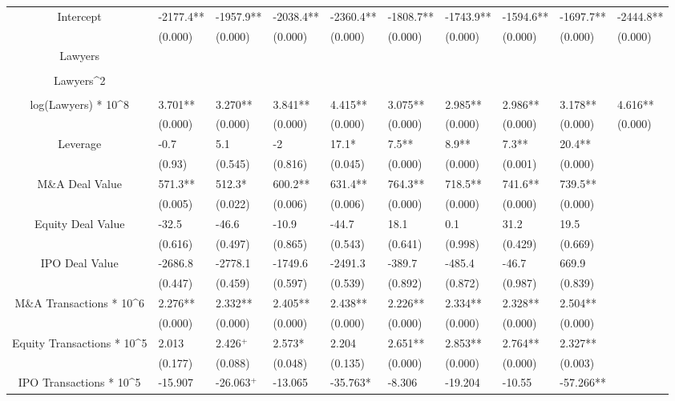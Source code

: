 \documentclass{article}
\begin{document}
\begin{table}[H]
\begin{tabular}{|clllllllll|}
Intercept & -2177.4** & -1957.9** & -2038.4** & -2360.4** & -1808.7** & -1743.9** & -1594.6** & -1697.7** & -2444.8** \\
   & (0.000) & (0.000) & (0.000) & (0.000) & (0.000) & (0.000) & (0.000) & (0.000) & (0.000) \\
  Lawyers &  &  &  &  &  &  &  &  &  \\
   &  &  &  &  &  &  &  &  &  \\
  Lawyers^2 &  &  &  &  &  &  &  &  &  \\
   &  &  &  &  &  &  &  &  &  \\
  log(Lawyers) * 10^8 & 3.701** & 3.270** & 3.841** & 4.415** & 3.075** & 2.985** & 2.986** & 3.178** & 4.616** \\
   & (0.000) & (0.000) & (0.000) & (0.000) & (0.000) & (0.000) & (0.000) & (0.000) & (0.000) \\
  Leverage & -0.7 & 5.1 & -2 & 17.1* & 7.5** & 8.9** & 7.3** & 20.4** &  \\
   & (0.93) & (0.545) & (0.816) & (0.045) & (0.000) & (0.000) & (0.001) & (0.000) &  \\
  M\&A Deal Value & 571.3** & 512.3* & 600.2** & 631.4** & 764.3** & 718.5** & 741.6** & 739.5** &  \\
   & (0.005) & (0.022) & (0.006) & (0.006) & (0.000) & (0.000) & (0.000) & (0.000) &  \\
  Equity Deal Value & -32.5 & -46.6 & -10.9 & -44.7 & 18.1 & 0.1 & 31.2 & 19.5 &  \\
   & (0.616) & (0.497) & (0.865) & (0.543) & (0.641) & (0.998) & (0.429) & (0.669) &  \\
  IPO Deal Value & -2686.8 & -2778.1 & -1749.6 & -2491.3 & -389.7 & -485.4 & -46.7 & 669.9 &  \\
   & (0.447) & (0.459) & (0.597) & (0.539) & (0.892) & (0.872) & (0.987) & (0.839) &  \\
  M\&A Transactions * 10^6 & 2.276** & 2.332** & 2.405** & 2.438** & 2.226** & 2.334** & 2.328** & 2.504** &  \\
   & (0.000) & (0.000) & (0.000) & (0.000) & (0.000) & (0.000) & (0.000) & (0.000) &  \\
  Equity Transactions * 10^5 & 2.013 & 2.426$^{+}$ & 2.573* & 2.204 & 2.651** & 2.853** & 2.764** & 2.327** &  \\
   & (0.177) & (0.088) & (0.048) & (0.135) & (0.000) & (0.000) & (0.000) & (0.003) &  \\
  IPO Transactions * 10^5 & -15.907 & -26.063$^{+}$ & -13.065 & -35.763* & -8.306 & -19.204 & -10.55 & -57.266** &  \\

\end{tabular}
\end{table}
\end{document}
